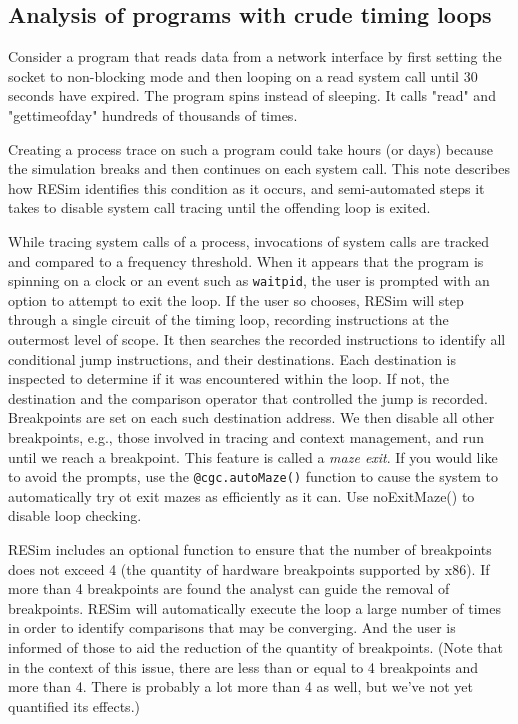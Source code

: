 \documentclass[titlepage]{article}
\begin{document}
\begin{appendices}

\subsection{Analysis of programs with crude timing loops}
\label{maze}
Consider a program that reads data from a network interface by first setting the socket to non-blocking mode and then looping on a read system call until 30 seconds have expired.  The program spins instead of sleeping.  It calls "read" and "gettimeofday" hundreds of thousands of times.

Creating a process trace on such a program could take hours (or days) because the simulation breaks and then continues on each system call.  This note describes how RESim identifies this condition as it occurs, and semi-automated steps it takes to disable system call tracing until the offending loop is exited.  

While tracing system calls of a process, invocations of system calls are tracked and compared to a frequency threshold.  When it appears that the program is spinning on a clock or an event such as {\tt waitpid}, the user is prompted with an option to attempt to exit the loop. If the user so chooses, RESim will step through a single circuit of the timing loop, recording instructions at the outermost level of scope. It then searches the recorded instructions to identify all conditional jump instructions, and their destinations. Each destination is inspected to determine if it was encountered within the loop.  If not, the destination and the comparison operator that controlled the jump is recorded.  Breakpoints are set on each such destination address.  We then disable all other breakpoints, e.g., those involved in tracing and context management, and run until we reach a breakpoint.  
This feature is called a \textit{maze exit}.  If you would like to avoid the prompts, use the {\tt @cgc.autoMaze()} function to cause the system
to automatically try ot exit mazes as efficiently as it can.  Use noExitMaze() to disable loop checking.

RESim includes an optional function to ensure that the number of breakpoints does not exceed 4 (the quantity of hardware breakpoints supported by x86).  If more than 4 breakpoints are found the analyst can guide the removal of breakpoints. RESim will automatically execute the loop a large number of times in order to identify comparisons that may be converging.  And the user is informed of those to aid the reduction of the quantity of breakpoints.  (Note that in the context of this issue, there are less than or equal to 4 breakpoints and more than 4.  There is probably a lot more than 4 as well, but we've not yet quantified its effects.)


\end{appendices}
\end{document}
